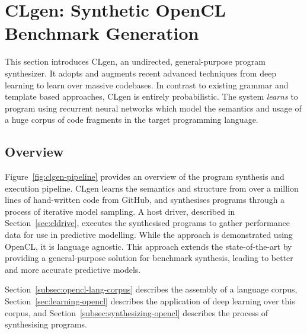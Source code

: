 \section{CLgen: Synthetic OpenCL Benchmark Generation}%
\label{sec:clgen}

This section introduces CLgen, an undirected, general-purpose program synthesizer. It adopts and augments recent advanced techniques from deep learning to learn over massive codebases. In contrast to existing grammar and template based approaches, CLgen is entirely probabilistic. The system \emph{learns} to program using recurrent neural networks which model the semantics and usage of a huge corpus of code fragments in the target programming language.

\subsection{Overview}

Figure~\ref{fig:clgen-pipeline} provides an overview of the program synthesis and execution pipeline. CLgen learns the semantics and structure from over a million lines of hand-written code from GitHub, and synthesises programs through a process of iterative model sampling. A host driver, described in Section~\ref{sec:cldrive}, executes the synthesised programs to gather performance data for use in predictive modelling. While the approach is demonstrated using OpenCL, it is language agnostic. This approach extends the state-of-the-art by providing a general-purpose solution for benchmark synthesis, leading to better and more accurate predictive models.

Section~\ref{subsec:opencl-lang-corpus} describes the assembly of a language corpus, Section~\ref{sec:learning-opencl} describes the application of deep learning over this corpus, and Section~\ref{subsec:synthesizing-opencl} describes the process of synthesising programs.

